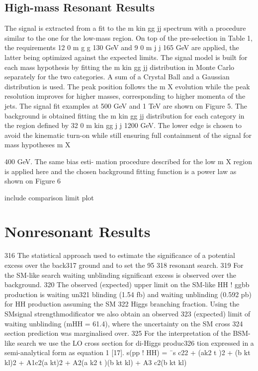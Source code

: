 \subsection{High-mass Resonant Results}

The signal is  extracted from a fit  to the
m
kin
gg
jj
spectrum with a  procedure similar to the  one
for  the  low-mass  region.   On  top  of  the  pre-selection  in  Table  1,  the  requirements  12
0
m
g
g
130 GeV and 9
0
m
j
j
165 GeV are applied, the latter being optimized against
the expected limits.
The signal model is built for each mass hypothesis by fitting the
m
kin
gg
jj
distribution in Monte
Carlo separately for the two categories.  A sum of a Crystal Ball and a Gaussian distribution
is used.  The peak position follows the
m
X
evolution while the peak resolution improves for
higher masses,  corresponding to higher momenta of the jets.  The signal fit examples at 500
GeV and 1 TeV are shown on Figure 5.
The background is obtained fitting the
m
kin
gg
jj
distribution for each category in the region defined
by 32
0
m
kin
gg
j
j
1200 GeV. The lower edge is chosen to avoid the kinematic turn-on while still
ensuring full containment of the signal for mass hypotheses
m
X




400 GeV. The same bias esti-
mation procedure described for the low
m
X
region is applied here and the chosen background
fitting function is a power law as shown on Figure 6


include comparison limit plot

\section{Nonresonant Results\label{sec:nonresresults}}

316 The statistical approach used to estimate the significance of a potential excess over the back317
ground and to set the 95%
318 resonant search.
319 For the SM-like search waiting unblinding significant excess is observed over the background.
320 The observed (expected) upper limit on the SM-like HH ! ggbb production is waiting un321
blinding (1.54 fb) and waiting unblinding (0.592 pb) for HH production assuming the SM
322 Higgs branching fraction. Using the SMsignal strengthmodificator we also obtain an observed
323 (expected) limit of waiting unblinding (mHH = 61.4), where the uncertainty on the SM cross
324 section prediction was marginalised over.
325 For the interpretation of the BSM-like search we use the LO cross section for di-Higgs produc326
tion expressed in a semi-analytical form as equation 1 [17].
s(pp ! HH) = ¯s
c22
+ (ak2
t )2 + (b kt kl)2 + A1c2(a kt)2 + A2(a k2
t )(b kt kl) + A3 c2(b kt kl)





